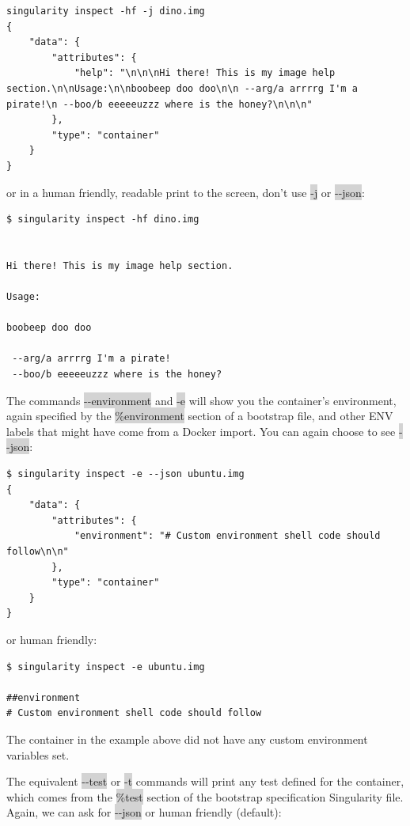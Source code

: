 \documentclass[a4paper]{article}
\newcounter{subsubsubsection}[subsubsection]
\begin{document}
\begin{lstlisting}[frame=single]
singularity inspect -hf -j dino.img
{
    "data": {
        "attributes": {
            "help": "\n\n\nHi there! This is my image help section.\n\nUsage:\n\nboobeep doo doo\n\n --arg/a arrrrg I'm a pirate!\n --boo/b eeeeeuzzz where is the honey?\n\n\n"
        },
        "type": "container"
    }
}
\end{lstlisting}

	or in a human friendly, readable print to the screen, don’t use \colorbox{lightgray}{-j} or \colorbox{lightgray}{-{}-json}:
	
\begin{lstlisting}[frame=single]
$ singularity inspect -hf dino.img


Hi there! This is my image help section.

Usage:

boobeep doo doo

 --arg/a arrrrg I'm a pirate!
 --boo/b eeeeeuzzz where is the honey?
\end{lstlisting}

	The commands \colorbox{lightgray}{-{}-environment} and \colorbox{lightgray}{-e} will show you the container’s environment, again specified by the \colorbox{lightgray}{\%environment} section of a bootstrap file, and other ENV labels that might have come from a Docker import. You can again choose to see \colorbox{lightgray}{-{}-json}:
	
\begin{lstlisting}[frame=single]
$ singularity inspect -e --json ubuntu.img
{
    "data": {
        "attributes": {
            "environment": "# Custom environment shell code should follow\n\n"
        },
        "type": "container"
    }
}

\end{lstlisting}	
	
or human friendly:

\begin{lstlisting}[frame=single]
$ singularity inspect -e ubuntu.img

##environment
# Custom environment shell code should follow
\end{lstlisting}

The container in the example above did not have any custom environment variables set.

	
	The equivalent  \colorbox{lightgray}{-{}-test} or  \colorbox{lightgray}{-t} commands will print any test defined for the container, which comes from the  \colorbox{lightgray}{\%test} section of the bootstrap specification Singularity file. Again, we can ask for  \colorbox{lightgray}{-{}-json} or human friendly (default):\\[0.1in]
	
\end{document}
